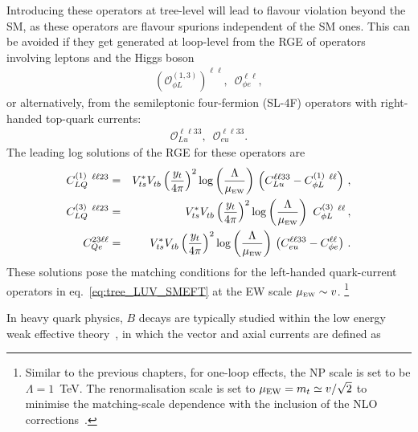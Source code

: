 \par Introducing these operators at tree-level will lead to flavour violation beyond the SM, as these operators are flavour spurions independent of the SM ones. This can be avoided if they get generated at loop-level from the RGE of operators involving leptons and the Higgs boson~\cite{Celis:2017doq} 
\begin{eqnarray} 
	\label{eq:SMEFT_op_HL}
	(	\mathcal{O}_{\phi L}^{(1,3)})^{\ell \ell},	\,\,\, 	\mathcal{O}_{\phi e}^{\ell \ell},
\end{eqnarray}
or alternatively, from the semileptonic four-fermion (SL-4F) operators with right-handed top-quark currents:
\begin{eqnarray} 
	\label{eq:SMEFT_op_loop_lu}
	\mathcal{O}_{Lu}^{\ell \ell 3 3}, \,	\,\,	\mathcal{O}_{eu}^{\ell \ell 3 3} .
\end{eqnarray}
The leading log solutions of the RGE for these operators are~\cite{Jenkins:2013zja,Jenkins:2013wua}
\begin{eqnarray}
	\label{eq:SMEFT_matching_1loop}
	C_{LQ}^{(1)}\ ^{\ell \ell 23} &=& V_{ts}^{*} V^{ }_{tb} \left(\frac{y_{t} }{4 \pi}\right)^2 \log \left( \frac{\Lambda}{\mu_{\textrm{\tiny{EW}}}} \right)   \, \left(C_{Lu}^{\ell \ell 3 3} - C_{\phi L}^{(1)}\ ^{\ell \ell} \right)\,,\nonumber \\
	C_{LQ}^{(3)}\ ^{\ell \ell 23} &=& V_{ts}^{*} V^{ }_{tb} \left(\frac{y_{t} }{4 \pi}\right)^2 \log \left( \frac{\Lambda}{\mu_{\textrm{\tiny{EW}}}} \right)  \ C_{\phi L}^{(3)}\ ^{\ell \ell}  \,,\nonumber \\
	C_{Qe}^{23\ell \ell} &=& V_{ts}^{*} V^{ }_{tb} \left(\frac{y_{t} }{4 \pi}\right)^2 \log \left( \frac{\Lambda}{\mu_{\textrm{\tiny{EW}}}} \right)   \, \left( C_{eu}^{\ell \ell 3 3} - C^{\ell \ell}_{\phi e}\right) \, .
\end{eqnarray}
 These solutions pose the matching conditions for the left-handed quark-current operators in eq.~\eqref{eq:tree_LUV_SMEFT} at the EW scale $\mu_{\textrm{\tiny{EW}}}\sim v$. \footnote{Similar to the previous chapters, for one-loop effects,  the NP scale is set to be $\Lambda = 1$~TeV.  The renormalisation scale is set to $\mu_{\rm EW} = m_t\simeq v/\sqrt{2}$ to minimise the matching-scale dependence with the inclusion of the NLO corrections~\cite{Aebischer:2015fzz,Bobeth:2017xry}.}
\par In heavy quark physics, $B$ decays are typically studied within the low energy weak effective theory~\cite{Buchalla:1995vs,Buras:1998raa,Silvestrini:2019sey}, in which the vector and axial currents are defined as
